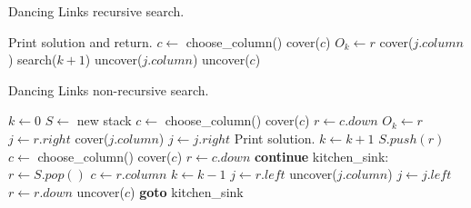 \documentclass[a4paper]{article}
\begin{document}
\begin{algorithm}[p]
	\caption{Dancing Links recursive search.}
	\label{alg:search}
	\begin{distribalgo}[1]
				\STATE Print solution and return.  
			\ENDIF
			\STATE $c \leftarrow$ choose\_column()
			\STATE cover($c$)
				\STATE $O_k \leftarrow r$  
					\STATE cover($j.column$)
				\ENDFOR
				\STATE search($k + 1$)
					\STATE uncover($j.column$)
				\ENDFOR
			\ENDFOR
			\STATE uncover($c$)
		\ENDPROC
	\end{distribalgo}
\end{algorithm}


\begin{algorithm}[p]
	\caption{Dancing Links non-recursive search.}
	\label{alg:nrsearch}
	\begin{distribalgo}[1]
			\STATE $k \leftarrow 0$
			\STATE $S \leftarrow$ new stack
			\STATE $c \leftarrow$ choose\_column()
			\STATE cover($c$)
			\STATE $r \leftarrow c.down$
				\STATE $O_k \leftarrow r$  
				\STATE $j \leftarrow r.right$
					\STATE cover($j.column$)
					\STATE $j \leftarrow j.right$
				\ENDWHILE
					\STATE Print solution.
				\ELSE
					\STATE $k \leftarrow k + 1$
					\STATE $S.push(r)$
					\STATE $c \leftarrow$ choose\_column()
					\STATE cover($c$)
					\STATE $r \leftarrow c.down$
					\STATE \textbf{continue}  
					\STATE kitchen\_sink:  
					\STATE $r \leftarrow S.pop()$
					\STATE $c \leftarrow r.column$
					\STATE $k \leftarrow k - 1$
				\ENDIF
				\STATE $j \leftarrow r.left$
					\STATE uncover($j.column$)
					\STATE $j \leftarrow j.left$
				\ENDWHILE
				\STATE $r \leftarrow r.down$
			\ENDWHILE
			\STATE uncover($c$)
				\STATE \textbf{goto} kitchen\_sink  
			\ENDIF
		\ENDPROC
	\end{distribalgo}
\end{algorithm}



\end{document}
